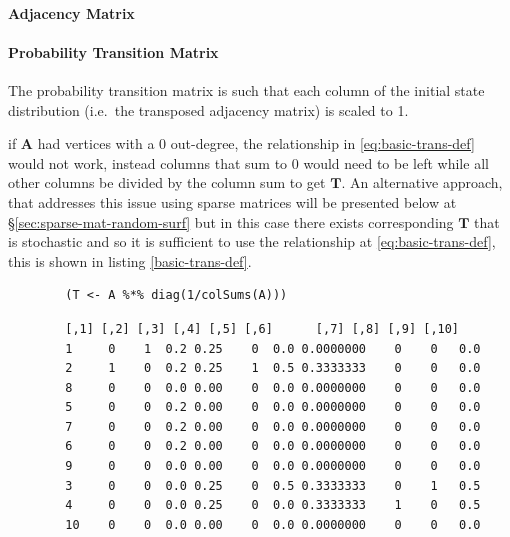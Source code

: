 \documentclass[11pt]{report}
\begin{document}
\paragraph{Adjacency Matrix}
\label{adjacency-matrix}

\paragraph{Probability Transition Matrix}
\label{probability-transition-matrix}
The probability transition matrix is such that each column of the
initial state distribution (i.e. the transposed adjacency matrix) is
scaled to 1.

if \(\mathbf{A}\) had vertices with a 0 out-degree, the relationship in
\eqref{eq:basic-trans-def} would not work, instead columns that sum to 0 would
need to be left while all other columns be divided by the column sum to get
\(\mathbf{T}\). An alternative approach, that addresses this issue using sparse
matrices will be presented below at \S \ref{sec:sparse-mat-random-surf} but in
this case there exists corresponding \(\mathbf{T}\) that is stochastic and so it
is sufficient to use the relationship at \eqref{eq:basic-trans-def}, this is
shown in listing \ref{basic-trans-def}.

\begin{listing}[htbp]
    \begin{tcolorbox}
        \begin{verbatim}
        (T <- A %*% diag(1/colSums(A)))
        \end{verbatim}
        \caption{\label{basic-trans-def}Solve the Transition Probability Matrix by scaling each column to 1 using matrix multiplication.}
    \tcblower
        \begin{verbatim}
        [,1] [,2] [,3] [,4] [,5] [,6]      [,7] [,8] [,9] [,10]
        1     0    1  0.2 0.25    0  0.0 0.0000000    0    0   0.0
        2     1    0  0.2 0.25    1  0.5 0.3333333    0    0   0.0
        8     0    0  0.0 0.00    0  0.0 0.0000000    0    0   0.0
        5     0    0  0.2 0.00    0  0.0 0.0000000    0    0   0.0
        7     0    0  0.2 0.00    0  0.0 0.0000000    0    0   0.0
        6     0    0  0.2 0.00    0  0.0 0.0000000    0    0   0.0
        9     0    0  0.0 0.00    0  0.0 0.0000000    0    0   0.0
        3     0    0  0.0 0.25    0  0.5 0.3333333    0    1   0.5
        4     0    0  0.0 0.25    0  0.0 0.3333333    1    0   0.5
        10    0    0  0.0 0.00    0  0.0 0.0000000    0    0   0.0
        \end{verbatim}
    \end{tcolorbox}
\end{listing}
\end{document}
